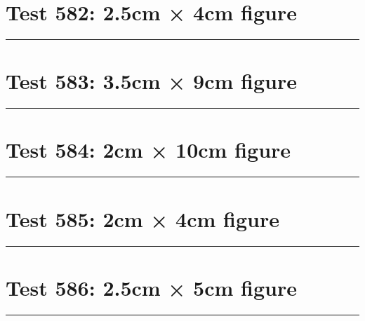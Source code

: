 \documentclass[a4paper,11pt]{article}
\begin{document}
\section*{Test 582: 2.5cm × 4cm figure}
\begin{swarmwrap}%
  \begin{minipage}[t]{2cm}
    \centering
    \rule{\linewidth}{4cm}
  \end{minipage}%
\end{swarmwrap}%
\swarmwrapnext
\lipsum[97]
\lipsum[98]
\lipsum[99]
\lipsum[100]
\lipsum[101]
\lipsum[102]
\section*{Test 583: 3.5cm × 9cm figure}
\begin{swarmwrap}%
  \begin{minipage}[t]{3cm}
    \centering
    \rule{\linewidth}{9cm}
  \end{minipage}%
\end{swarmwrap}%
\swarmwrapnext
\lipsum[98]
\lipsum[99]
\lipsum[100]
\lipsum[101]
\lipsum[102]
\lipsum[103]
\section*{Test 584: 2cm × 10cm figure}
\begin{swarmwrap}%
  \begin{minipage}[t]{2cm}
    \centering
    \rule{\linewidth}{10cm}
  \end{minipage}%
\end{swarmwrap}%
\swarmwrapnext
\lipsum[91]
\lipsum[92]
\lipsum[93]
\lipsum[94]
\section*{Test 585: 2cm × 4cm figure}
\begin{swarmwrap}%
  \begin{minipage}[t]{2cm}
    \centering
    \rule{\linewidth}{4cm}
  \end{minipage}%
\end{swarmwrap}%
\swarmwrapnext
\lipsum[137]
\lipsum[138]
\lipsum[139]
\lipsum[140]
\lipsum[141]
\lipsum[142]
\section*{Test 586: 2.5cm × 5cm figure}
\begin{swarmwrap}%
  \begin{minipage}[t]{2cm}
    \centering
    \rule{\linewidth}{5cm}
  \end{minipage}%
\end{swarmwrap}%
\swarmwrapnext
\lipsum[7]
\lipsum[8]
\lipsum[9]
\end{document}
